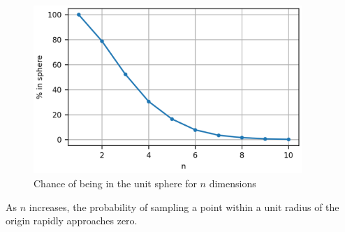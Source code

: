 \documentclass[11pt]{article}
\begin{document}
\subsection{}  %
\begin{figure}[H]
    \centering
    \includegraphics[width=4in]{3dfig1.png}
    \caption{Chance of being in the unit sphere for $n$ dimensions}
    \label{3dfig1}
\end{figure}
\begin{mdframed}
    As $n$ increases, the probability of sampling a point within a unit radius of
    the origin rapidly approaches zero.
\end{mdframed}

\subsection{}  %
\end{document}
